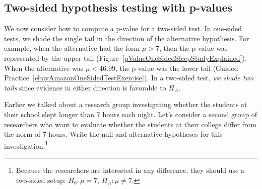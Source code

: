 \subsection{Two-sided hypothesis testing with p-values}
\label{twoSidedTestsWithPValues}


We now consider how to compute a p-value for a two-sided test. In one-sided tests, we shade the single tail in the direction of the alternative hypothesis. For example, when the alternative had the form $\mu > 7$, then the p-value was represented by the upper tail (Figure~\ref{pValueOneSidedSleepStudyExplained}). When the alternative was $\mu < 46.99$, the p-value was the lower tail (Guided Practice~\ref{ebayAmazonOneSidedTestExercise}). In a two-sided test, \emph{we shade two tails} since evidence in either direction is favorable to $H_A$.

\begin{exercise} \label{2ndSchSleepHypSetupExercise}
Earlier we talked about a research group investigating whether the students at their school slept longer than 7 hours each night. Let's consider a second group of researchers who want to evaluate whether the students at their college differ from the norm of 7 hours. Write the null and alternative hypotheses for this investigation.\footnote{Because the researchers are interested in any difference, they should use a two-sided setup: $H_0: \mu = 7$, $H_A: \mu \neq 7$.}
\end{exercise}

